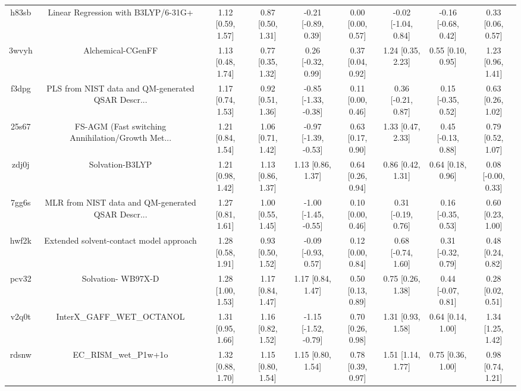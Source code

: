 \documentclass{article}
\begin{document}
\begin{center}
\begin{longtable}{|ccccccccc|}
 h83sb &                Linear Regression with B3LYP/6-31G+ &  1.12 [0.59, 1.57] &  0.87 [0.50, 1.31] &   -0.21 [-0.89, 0.39] &  0.00 [0.00, 0.57] &  -0.02 [-1.04, 0.84] &  -0.16 [-0.68, 0.42] &     0.33 [0.06, 0.57] \\
 3wvyh &                                  Alchemical-CGenFF &  1.13 [0.48, 1.74] &  0.77 [0.35, 1.32] &    0.26 [-0.32, 0.99] &  0.37 [0.04, 0.92] &    1.24 [0.35, 2.23] &    0.55 [0.10, 0.95] &     1.23 [0.96, 1.41] \\
 f3dpg &  PLS from NIST data and QM-generated QSAR Descr... &  1.17 [0.74, 1.53] &  0.92 [0.51, 1.36] &  -0.85 [-1.33, -0.38] &  0.11 [0.00, 0.46] &   0.36 [-0.21, 0.87] &   0.15 [-0.35, 0.52] &     0.63 [0.26, 1.02] \\
 25s67 &  FS-AGM (Fast switching Annihilation/Growth Met... &  1.21 [0.84, 1.54] &  1.06 [0.71, 1.42] &  -0.97 [-1.39, -0.53] &  0.63 [0.17, 0.90] &    1.33 [0.47, 2.33] &   0.45 [-0.13, 0.88] &     0.79 [0.52, 1.07] \\
 zdj0j &                                    Solvation-B3LYP &  1.21 [0.98, 1.42] &  1.13 [0.86, 1.37] &     1.13 [0.86, 1.37] &  0.64 [0.26, 0.94] &    0.86 [0.42, 1.31] &    0.64 [0.18, 0.96] &    0.08 [-0.00, 0.33] \\
 7gg6s &  MLR from NIST data and QM-generated QSAR Descr... &  1.27 [0.81, 1.61] &  1.00 [0.55, 1.45] &  -1.00 [-1.45, -0.55] &  0.10 [0.00, 0.46] &   0.31 [-0.19, 0.76] &   0.16 [-0.35, 0.53] &     0.60 [0.23, 1.00] \\
 hwf2k &            Extended solvent-contact model approach &  1.28 [0.58, 1.91] &  0.93 [0.50, 1.52] &   -0.09 [-0.93, 0.57] &  0.12 [0.00, 0.84] &   0.68 [-0.74, 1.60] &   0.31 [-0.32, 0.79] &     0.48 [0.24, 0.82] \\
 pcv32 &                                 Solvation- WB97X-D &  1.28 [1.00, 1.53] &  1.17 [0.84, 1.47] &     1.17 [0.84, 1.47] &  0.50 [0.13, 0.89] &    0.75 [0.26, 1.38] &   0.44 [-0.07, 0.81] &     0.28 [0.02, 0.51] \\
 v2q0t &                         InterX\_GAFF\_WET\_OCTANOL &  1.31 [0.95, 1.66] &  1.16 [0.82, 1.52] &  -1.15 [-1.52, -0.79] &  0.70 [0.26, 0.98] &    1.31 [0.93, 1.58] &    0.64 [0.14, 1.00] &     1.34 [1.25, 1.42] \\
 rdsnw &                              EC\_RISM\_wet\_P1w+1o &  1.32 [0.88, 1.70] &  1.15 [0.80, 1.54] &     1.15 [0.80, 1.54] &  0.78 [0.39, 0.97] &    1.51 [1.14, 1.77] &    0.75 [0.36, 1.00] &     0.98 [0.74, 1.21] \\

\end{longtable}
\end{center}
\end{document}
